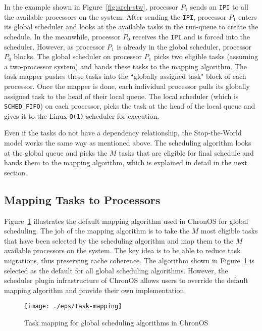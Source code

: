 \documentclass[12pt,dvips]{report}
\begin{document}
In the example shown in Figure~\ref{fig:arch-stw}, processor $P_1$ sends an \texttt{IPI} to all the available processors on the system. After sending the \texttt{IPI}, processor $P_1$ enters its global scheduler and looks at the available tasks in the run-queue to create the schedule. In the meanwhile, processor $P_0$ receives the \texttt{IPI} and is forced into the scheduler. However, as processor $P_1$ is already in the global scheduler, processor $P_0$ blocks. The global scheduler on processor $P_1$ picks two eligible tasks (assuming a two-processor system) and hands these tasks to the mapping algorithm. The task mapper pushes these tasks into the ``globally assigned task" block of each processor. Once the mapper is done, each individual processor pulls its globally assigned task to the head of their local queue. The local scheduler (which is \texttt{SCHED\_FIFO}) on each processor, picks the task at the head of the local queue and gives it to the Linux \texttt{O(1)} scheduler for execution.

Even if the tasks do not have a dependency relationship, the Stop-the-World model works the same way as mentioned above. The scheduling algorithm looks at the global queue and picks the $M$ tasks that are eligible for final schedule and hands them to the mapping algorithm, which is explained in detail in the next section. 

\subsection{Mapping Tasks to Processors}

Figure~\ref{fig:task-mapping} illustrates the default mapping algorithm used in ChronOS for global scheduling. The job of the mapping algorithm is to take the $M$ most eligible tasks that have been selected by the scheduling algorithm and map them to the $M$ available processors on the system. The key idea is to be able to reduce task migrations, thus preserving cache coherence. The algorithm shown in Figure~\ref{fig:task-mapping} is selected as the default for all global scheduling algorithms. However, the scheduler plugin infrastructure of ChronOS allows users to override the default mapping algorithm and provide their own implementation. 

\begin{figure} [htbp]
  \centering
  \texttt{[image: ./eps/task-mapping]}
  \caption{Task mapping for global scheduling algorithms in ChronOS}
  \label{fig:task-mapping}
\end{figure}
\end{document}
